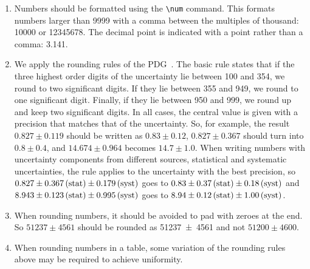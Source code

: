 \begin{enumerate}
\item Numbers should be formatted using the \texttt{\textbackslash{}num} 
  command. This formats numbers larger than \num{9999} with a comma between the 
  multiples of thousand: \eg \num{10000} or \num{12345678}.  The decimal point 
  is indicated with a point rather than a comma: \eg \num{3.141}.

\item We apply the rounding rules of the
  PDG~\cite{PDG2016}. The basic rule states that if the three
  highest order digits of the uncertainty lie between 100 and 354, we round
  to two significant digits. If they lie between 355 and 949, we round
  to one significant digit. Finally, if they lie between 950 and 999,
  we round up and keep two significant digits. In all cases,
  the central value is given with a precision that matches that of the
  uncertainty. So, for example, the result $0.827 \pm 0.119$ should be
  written as $0.83\pm 0.12$, $0.827\pm 0.367$ should turn into
  $0.8\pm 0.4$, and $14.674\pm0.964$ becomes $14.7\pm1.0$.
 When writing numbers with uncertainty components from
  different sources, \ie statistical and systematic uncertainties, the rule
  applies to the uncertainty with the best precision, so $0.827\pm
  0.367\mathrm{\,(stat)}\pm 0.179\mathrm{\,(syst)}$ goes to $0.83\pm 0.37\mathrm{\,(stat)}\pm 0.18\mathrm{\,(syst)}$ and
  $8.943\pm 0.123\mathrm{\,(stat)}\pm 0.995\mathrm{\,(syst)}$ goes to $8.94\pm 0.12\mathrm{\,(stat)}\pm
  1.00\mathrm{\,(syst)}$.

\item When rounding numbers, it should be avoided to pad with zeroes
  at the end. So $51237 \pm 4561$ should be rounded as 
  \num[round-mode=places,round-precision=2]{51237 \pm 4561} and not $51200 \pm 
  4600$.

\item When rounding numbers in a table, some variation of the rounding
  rules above may be required to achieve uniformity.


\end{enumerate}
